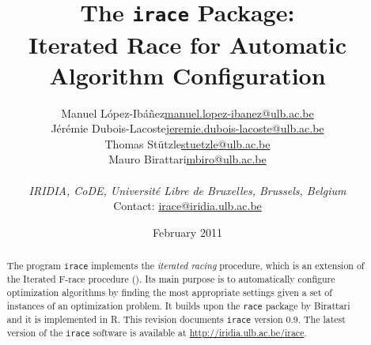 \documentclass[a4paper]{article}
\makeatletter
\newcommand{\irace}{\texttt{irace}\xspace}
\newcommand{\iraceversion}{0.9\xspace}
\providecommand{\IridiaTrCover}[1][]{}
\newcommand{\techrep}{2011-004}
\newcommand{\techdate}{February 2011}
\newcommand{\revdate}{February 2011}
\providecommand{\email}[2]{\normalsize\href{mailto:#1@#2}{\textsf{#1}\textrm{@}\textsf{#2}}}
\newcommand{\aR}{\textsf{R}\xspace}
\newcommand{\IFRACE}{\text{I/F-Race}\xspace}
\makeatother
\begin{document}
\title{The \irace Package:\\ Iterated Race for Automatic Algorithm Configuration}

\author{
  \begin{minipage}[c]{0.9\linewidth}
    \begin{center}
      \begin{tabular*}{0.7\linewidth}{@{\extracolsep{\fill}}lr}
        Manuel L\'opez-Ib\'a\~nez &\email{manuel.lopez-ibanez}{ulb.ac.be} \\    
        J\'er\'emie Dubois-Lacoste & \email{jeremie.dubois-lacoste}{ulb.ac.be} \\               
        Thomas St\"utzle & \email{stuetzle}{ulb.ac.be} \\              
        Mauro Birattari & \email{mbiro}{ulb.ac.be} \\                 
      \end{tabular*}\\[1.5ex]
      \normalsize\emph{IRIDIA, CoDE, Universit\'e Libre de Bruxelles, Brussels, Belgium}\\
      Contact: \email{irace}{iridia.ulb.ac.be}
    \end{center}
  \end{minipage}}

\date{\revdate}

\IridiaTrCover[%
  author={%
Manuel \textsc{L\'opez-Ib\'a\~nez} \and J\'er\'emie \textsc{Dubois-Lacoste}%
\and Thomas \textsc{St\"utzle} \and Mauro \textsc{Birattari}
},
  date=\techdate,
  number=\techrep]%

\maketitle

\begin{abstract}
  The program \irace implements the \emph{iterated racing} procedure,
  which is an extension of the Iterated F-race procedure (\IFRACE).
  Its main purpose is to automatically configure optimization
  algorithms by finding the most appropriate settings given a set of
  instances of an optimization problem. It builds upon the
  \texttt{race} package by Birattari and it is implemented in
  \aR. This revision documents \irace version \iraceversion. The
  latest version of the \irace software is available at \url{http://iridia.ulb.ac.be/irace}.
\end{abstract}
\end{document}
